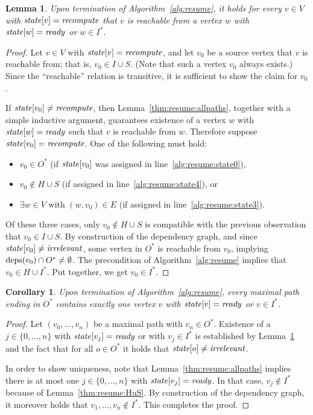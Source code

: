 \documentclass[paper=letter,fontsize=11pt,captions=tableheading]{scrartcl}
\numberwithin{equation}{section}
\theoremstyle{algorithm}
\theoremstyle{plain}
\newtheorem{lemma}[equation]{Lemma}
\newtheorem{corollary}[equation]{Corollary}
\theoremstyle{nonumberplain}
\newtheorem{proof}{Proof}
\begin{document}
\begin{lemma} \label{thm:resume:recomputenodes}
	Upon termination of Algorithm~\ref{alg:resume}, it holds for every $v \in V$ with $\mathit{state}[v] = \mathit{recompute}$ that $v$ is reachable from a vertex $w$ with $\mathit{state}[w] = \mathit{ready}$ or $w \in I^*$.
\end{lemma}

\begin{proof}
	Let $v \in V$ with $\mathit{state}[v] = \mathit{recompute}$, and let $v_0$ be a source vertex that $v$ is reachable from; that is, $v_0 \in I \cup S$. (Note that such a vertex $v_0$ always exists.) Since the ``reachable'' relation is transitive, it is sufficient to show the claim for $v_0$.

	If $\mathit{state}[v_0] \neq \mathit{recompute}$, then Lemma~\ref{thm:resume:allpaths}, together with a simple inductive argument, guarantees existence of a vertex $w$ with $\mathit{state}[w] = \mathit{ready}$ such that $v$ is reachable from $w$. Therefore suppose $\mathit{state}[v_0] = \mathit{recompute}$. One of the following must hold:
	\begin{itemize}
		\item $v_0 \in O^*$ (if $\mathit{state}[v_0]$ was assigned in line~\ref{alg:resume:state0}),
		\item $v_0 \notin H \cup S$ (if assigned in line~\ref{alg:resume:state4}), or
		\item $\exists w \in V$ with $(w, v_0) \in E$ (if assigned in line~\ref{alg:resume:state3}).
	\end{itemize}
	Of these three cases, only $v_0 \notin H \cup S$ is compatible with the previous observation that $v_0 \in I \cup S$. By construction of the dependency graph, and since $\mathit{state}[v_0] \neq \mathit{irrelevant}$, some vertex in $O^*$ is reachable from $v_0$, implying $\operatorname{deps}(v_0) \cap O^* \neq \emptyset$. The precondition of Algorithm~\ref{alg:resume} implies that $v_0 \in H \cup I^*$. Put together, we get $v_0 \in I^*$.
\end{proof}

\begin{corollary} \label{thm:resume:exactlyone}
	Upon termination of Algorithm~\ref{alg:resume}, every maximal path ending in $O^*$ contains exactly one vertex $v$ with $\mathit{state}[v] = \mathit{ready}$ or $v \in I^*$.
\end{corollary}

\begin{proof}
	Let $(v_0, \dots, v_n)$ be a maximal path with $v_n \in O^*$. Existence of a $j \in \{ 0, \dots, n\} $ with $\mathit{state}[v_j] = \mathit{ready}$ or with $v_j \in I^*$ is established by Lemma~\ref{thm:resume:recomputenodes} and the fact that for all $o \in O^*$ it holds that $\mathit{state}[o] \neq \mathit{irrelevant}$.

	In order to show uniqueness, note that Lemma~\ref{thm:resume:allpaths} implies there is at most one $j \in \{ 0, \dots, n\} $ with $\mathit{state}[v_j] = \mathit{ready}$. In that case, $v_j \notin I^*$ because of Lemma~\ref{thm:resume:HuS}. By construction of the dependency graph, it moreover holds that $v_1, \dots, v_n \notin I^*$. This completes the proof.
\end{proof}
\end{document}
